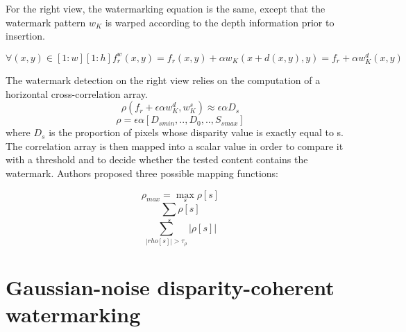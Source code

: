 For the right view, the watermarking equation is the same, except that the watermark pattern $w_{K}$ is warped according to the depth information prior to insertion.

$$\forall(x,y) \in [1:w][1:h] f_{r}^{w}(x,y) = f_{r}(x,y)+\alpha w_{K}(x+d(x,y),y) = f_{r}+\alpha w_{K}^{d}(x,y) $$

The watermark detection on the right view relies on the computation of a horizontal cross-correlation array.\newline
$$\rho (f_{r}+\epsilon\alpha w_{K}^{d},w_{K}^{s})\approx\epsilon\alpha D_{s} $$
$$ \rho = \epsilon\alpha [D_{smin},..,D_{0},..,S_{smax}]$$
where $D_{s}$ is the proportion of pixels whose disparity value is exactly equal to s.\newline
The correlation array is then mapped into a scalar value in order to compare it with a threshold and to decide whether the tested content contains the watermark. Authors proposed three possible mapping functions:

$$\rho_{max}= \max_{s}\rho[s] $$
$$ \sum_{s}\rho[s] $$
$$ \sum_{|rho[s]|>\tau_{\rho}}|\rho[s]| $$

\section{Gaussian-noise disparity-coherent watermarking} 

